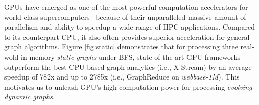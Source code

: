 %
%
%
%
%
%
%
%


GPUs have emerged as one of the most powerful computation accelerators for world-class supercomputers~\cite{titan} because of their unparalleled massive amount of parallelism and ability to speedup a wide range of HPC applications. Compared to its counterpart CPU, it also often provides superior acceleration for general graph algorithms. Figure \ref{fig:static} demonstrates that for processing three real-wold in-memory \textit{static graphs} under BFS, state-of-the-art GPU frameworks outperform the best CPU-based graph analytics (i.e., X-Stream) by an average speedup of 782x and up to 2785x (i.e., GraphReduce on \textit{webbase-1M}). This motivates us to unleash GPU's high computation power for processing \textit{evolving dynamic graphs}. 

